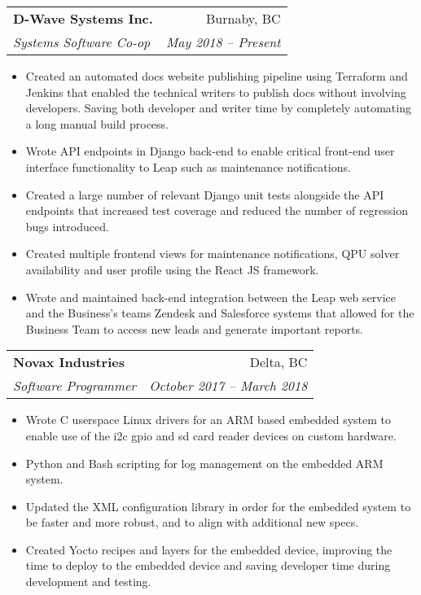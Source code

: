 \documentclass[letterpaper,11pt]{article}
\makeatletter
\newcommand{\resumeItem}[2]{
  \item\small{
    \textbf{#1}{#2 \vspace{-2pt}}
  }
}
\newcommand{\resumeSubheading}[4]{
  \vspace{-1pt}\item
    \begin{tabular*}{0.97\textwidth}[t]{l@{\extracolsep{\fill}}r}
      \textbf{#1} & #2 \\
      \textit{\small#3} & \textit{\small #4} \\
    \end{tabular*}\vspace{-5pt}
}
\newcommand{\resumeItemListStart}{\begin{itemize}}
\newcommand{\resumeItemListEnd}{\end{itemize}\vspace{-5pt}}
\makeatother
\begin{document}
    \resumeSubheading
      {D-Wave Systems Inc.}{Burnaby, BC}
      {Systems Software Co-op}{May 2018 -- Present}
      \resumeItemListStart
        \resumeItem{} {Created an automated docs website publishing pipeline using Terraform and Jenkins that enabled the technical writers to publish docs without involving developers. Saving both developer and writer time by completely automating a long manual build process.}
        \resumeItem{} {Wrote API endpoints in Django back-end to enable critical front-end user interface functionality to Leap such as maintenance notifications.}
        \resumeItem{} {Created a large number of relevant Django unit tests alongside the API endpoints that increased test coverage and reduced the number of regression bugs introduced.}
        \resumeItem{} {Created multiple frontend views for maintenance notifications, QPU solver availability and user profile using the React JS framework.}
        \resumeItem{} {Wrote and maintained back-end integration between the Leap web service and the Business's teams Zendesk and Salesforce systems that allowed for the Business Team to access new leads and generate important reports.}
      \resumeItemListEnd

    \resumeSubheading
      {Novax Industries}{Delta, BC}
      {Software Programmer}{October 2017 -- March 2018}
      \resumeItemListStart
        \resumeItem{} {Wrote C userspace Linux drivers for an ARM based embedded system to enable use of the i2c gpio and sd card reader devices on custom hardware.}
        \resumeItem{} {Python and Bash scripting for log management on the embedded ARM system.}
        \resumeItem{} {Updated the XML configuration library in order for the embedded system to be faster and more robust, and to align with additional new specs.}
        \resumeItem{} {Created Yocto recipes and layers for the embedded device, improving the time to deploy to the embedded device and saving developer time during development and testing.}
      \resumeItemListEnd
\end{document}
